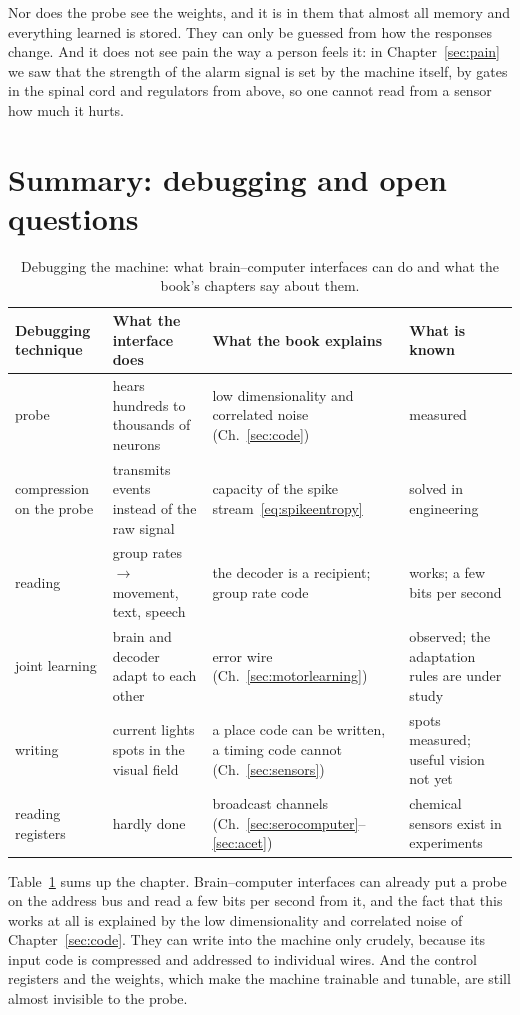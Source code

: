 Nor does the probe see the weights, and it is in them that almost all memory and everything learned is stored. They can only be guessed from how the responses change. And it does not see pain the way a person feels it: in Chapter~\ref{sec:pain} we saw that the strength of the alarm signal is set by the machine itself, by gates in the spinal cord and regulators from above, so one cannot read from a sensor how much it hurts.

\section{Summary: debugging and open questions}

\begin{table}[t]
\centering
\footnotesize
\setlength{\tabcolsep}{4pt}
\renewcommand{\arraystretch}{1.15}
\begin{tabular}{>{\raggedright}p{2.2cm}>{\raggedright}p{3.6cm}>{\raggedright}p{3.4cm}>{\raggedright\arraybackslash}p{4.0cm}}
\toprule
Debugging technique & What the interface does & What the book explains & What is known \\
\midrule
probe & hears hundreds to thousands of neurons & low dimensionality and correlated noise (Ch.~\ref{sec:code}) & measured \\
compression on the probe & transmits events instead of the raw signal & capacity of the spike stream~\eqref{eq:spikeentropy} & solved in engineering \\
reading & group rates $\to$ movement, text, speech & the decoder is a recipient; group rate code & works; a few bits per second \\
joint learning & brain and decoder adapt to each other & error wire (Ch.~\ref{sec:motorlearning}) & observed; the adaptation rules are under study \\
writing & current lights spots in the visual field & a place code can be written, a timing code cannot (Ch.~\ref{sec:sensors}) & spots measured; useful vision not yet \\
reading registers & hardly done & broadcast channels (Ch.~\ref{sec:serocomputer}--\ref{sec:acet}) & chemical sensors exist in experiments \\
\bottomrule
\end{tabular}
\caption{Debugging the machine: what brain–computer interfaces can do and what the book's chapters say about them.}
\label{tab:debugging}
\end{table}

Table~\ref{tab:debugging} sums up the chapter. Brain–computer interfaces can already put a probe on the address bus and read a few bits per second from it, and the fact that this works at all is explained by the low dimensionality and correlated noise of Chapter~\ref{sec:code}. They can write into the machine only crudely, because its input code is compressed and addressed to individual wires. And the control registers and the weights, which make the machine trainable and tunable, are still almost invisible to the probe.

